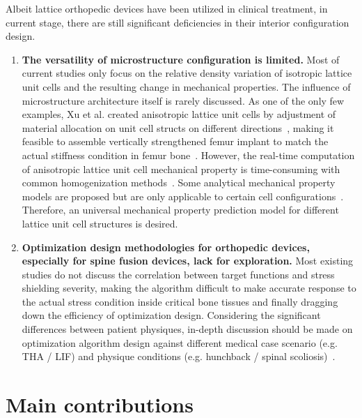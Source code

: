 \documentclass[12pt]{extbook}
\begin{document}
Albeit lattice orthopedic devices have been utilized in clinical treatment, in current stage, there are still significant deficiencies in their interior configuration design.\\

\begin{enumerate}

\item {\bf The versatility of microstructure configuration is limited.} Most of current studies only focus on the relative density variation of isotropic lattice unit cells and the resulting change in mechanical properties. The influence of microstructure architecture itself is rarely discussed. As one of the only few examples, Xu et al. created anisotropic lattice unit cells by adjustment of material allocation on unit cell structs on different directions~\cite{xu2016design}, making it feasible to assemble vertically strengthened femur implant to match the actual stiffness condition in femur bone~\cite{painkra2018anisotropic}. However, the real-time computation of anisotropic lattice unit cell mechanical property is time-consuming with common homogenization methods~\cite{dong2019149}. Some analytical mechanical property models are proposed but are only applicable to certain cell configurations~\cite{xu2016design}. Therefore, an universal mechanical property prediction model for different lattice unit cell structures is desired.\\

\item {\bf Optimization design methodologies for orthopedic devices, especially for spine fusion devices, lack for exploration.} Most existing studies do not discuss the correlation between target functions and stress shielding severity, making the algorithm difficult to make accurate response to the actual stress condition inside critical bone tissues and finally dragging down the efficiency of optimization design. Considering the 
significant differences between patient physiques, in-depth discussion should be made on optimization algorithm design against different medical case scenario (e.g. THA / LIF) and physique conditions (e.g. hunchback / spinal scoliosis)~\cite{ezquerro2004combination}.\\

\end{enumerate}

\section{Main contributions}
\label{intro_cont}
\end{document}

